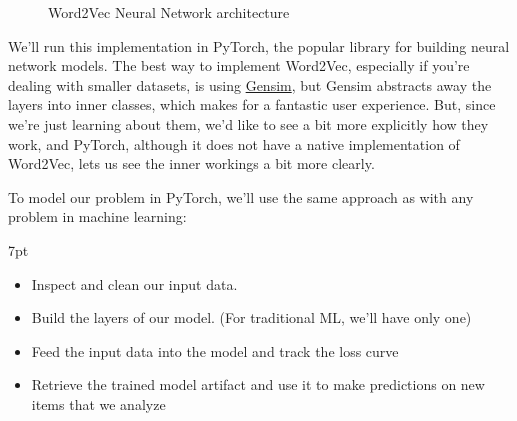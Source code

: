 \documentclass[11pt, table]{diazessay} %
\newenvironment{formal}{%
  \def\FrameCommand{%
    \hspace{1pt}%
    {\color{w_lightblue}\vrule width 2pt}%
    {\color{formalshade}\vrule width 4pt}%
    \colorbox{formalshade}%
  }%
  \MakeFramed{\advance\hsize-\width\FrameRestore}%
  \noindent\hspace{-4.55pt}%
  \begin{adjustwidth}{}{7pt}%
  \vspace{2pt}\vspace{2pt}%
}
{%
  \vspace{2pt}\end{adjustwidth}\endMakeFramed%
}
\begin{document}
\begin{sloppypar}
\begin{figure}[H]
\caption{Word2Vec Neural Network architecture}
\end{figure}

We'll run this implementation in PyTorch, the popular library for building neural network models. The best way to implement Word2Vec, especially if you're dealing with smaller datasets, is using \hyperlink{https://radimrehurek.com/gensim/}{Gensim}, but Gensim abstracts away the layers into inner classes, which makes for a fantastic user experience. But, since we're just learning about them, we'd like to see a bit more explicitly how they work, and PyTorch, although it does not have a native implementation of Word2Vec, lets us see the inner workings a bit more clearly. 

To model our problem in PyTorch, we'll use the same approach as with any problem in machine learning: 

\begin{formal}
\begin{itemize}
  \item Inspect and clean our input data.
  \item Build the layers of our model. (For traditional ML, we'll have only one)
  \item Feed the input data into the model and track the loss curve
  \item Retrieve the trained model artifact and use it to make predictions  on new items that we analyze
\end{itemize}
\end{formal}


\end{sloppypar}
\end{document}
